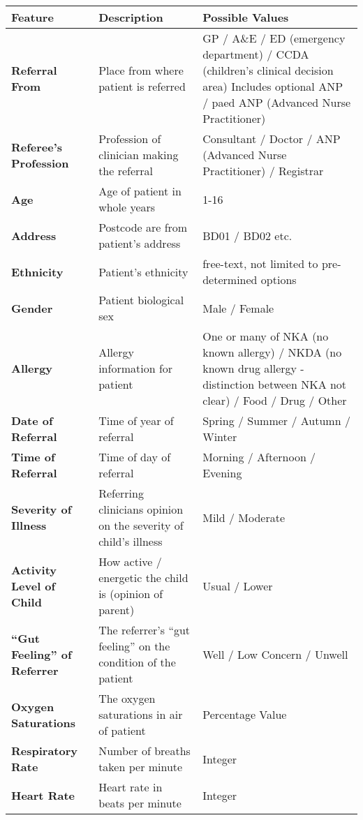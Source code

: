 \begin{longtable}[h]{ P{40mm}  P{45mm} P{45mm} }
    \toprule
    \textbf{Feature} & \textbf{Description} & \textbf{Possible Values} \\
    \toprule
    \endhead
    \textbf{Referral From} & Place from where patient is referred & GP / A\&E / ED (emergency department) / CCDA (children's clinical decision area) Includes optional ANP / paed ANP (Advanced Nurse Practitioner)
    \\\midrule
    \textbf{Referee's Profession} & Profession of clinician making the referral & Consultant / Doctor / ANP (Advanced Nurse Practitioner) / Registrar \\\midrule
    \textbf{Age} & Age of patient in whole years & 1-16 \\\midrule
    \textbf{Address} & Postcode are from patient's address & BD01 / BD02 etc. \\\midrule
    \textbf{Ethnicity} & Patient's ethnicity & free-text, not limited to pre-determined options\\\midrule
    \textbf{Gender} & Patient biological sex & Male / Female \\\midrule
    \textbf{Allergy} & Allergy information for patient & One or many of NKA (no known allergy) / NKDA (no known drug allergy - distinction between NKA not clear) / Food / Drug / Other \\\midrule
    \textbf{Date of Referral} & Time of year of referral & Spring / Summer / Autumn / Winter\\\midrule
    \textbf{Time of Referral} & Time of day of referral & Morning / Afternoon / Evening \\\midrule
    \textbf{Severity of Illness} & Referring clinicians opinion on the severity of child's illness & Mild / Moderate \\\midrule
    \textbf{Activity Level of Child} & How active / energetic the child is (opinion of parent) & Usual / Lower \\\midrule
    \textbf{``Gut Feeling'' of Referrer} & The referrer's ``gut feeling'' on the condition of the patient & Well / Low Concern / Unwell\\\midrule
    \textbf{Oxygen Saturations} & The oxygen saturations in air of patient & Percentage Value \\\midrule
    \textbf{Respiratory Rate} & Number of breaths taken per minute & Integer \\\midrule
    \textbf{Heart Rate} & Heart rate in beats per minute & Integer \\\midrule

\end{longtable}
